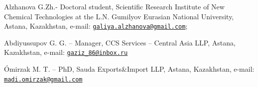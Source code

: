 \begin{authorinfo}
Alzhanova G.Zh.- Doctoral student, Scientific Research Institute of New
Chemical Technologies at the L.N. Gumilyov Eurasian National University,
Astana, Kazakhstan, e-mail:
\href{mailto:galiya.alzhanova@gmail.com}{\nolinkurl{galiya.alzhanova@gmail.com}};

Abdiyussupov G. G. -- Manager, CCS Services -- Central Asia LLP, Astana,
Kazakhstan, e-mail:
\href{mailto:gaziz_86@inbox.ru}{\nolinkurl{gaziz\_86@inbox.ru}}

Ómirzak M. T. -- PhD, Sauda Exports\&Import LLP, Astana, Kazakhstan,
e-mail:
\href{mailto:madi.omirzak@gmail.com}{\nolinkurl{madi.omirzak@gmail.com}}\
\end{authorinfo}
